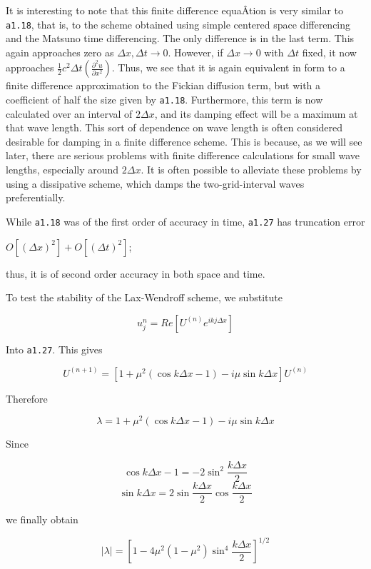 It is interesting to note that this finite difference equaÂ­tion is very
similar to \texttt{a1.18}, that is, to the scheme obtained using simple
centered space differencing and the Matsuno time differencing. The only
difference is in the last term. This again approaches zero as
\(\Delta x,\Delta t \rightarrow 0\). However, if
\(\Delta x \rightarrow 0\) with \(\Delta t\) fixed, it now approaches
\(\frac{1}{2}c^{2}\Delta t\left( \frac{\partial^{2}u}{\partial x^{2}} \right)\).
Thus, we see that it is again equivalent in form to a finite difference
approximation to the Fickian diffusion term, but with a coefficient of
half the size given by \texttt{a1.18}. Furthermore, this term is now
calculated over an interval of \(2\Delta x\), and its damping effect
will be a maximum at that wave length. This sort of dependence on wave
length is often considered desirable for damping in a finite difference
scheme. This is because, as we will see later, there are serious
problems with finite difference calculations for small wave lengths,
especially around \(2\Delta x\). It is often possible to alleviate these
problems by using a dissipative scheme, which damps the
two-grid-interval waves preferentially.

While \texttt{a1.18} was of the first order of accuracy in time,
\texttt{a1.27} has truncation error

\(O\left\lbrack \left( \Delta x \right)^{2} \right\rbrack + O\left\lbrack \left( \Delta t \right)^{2} \right\rbrack\);

thus, it is of second order accuracy in both space and time.

To test the stability of the Lax-Wendroff scheme, we substitute

{\[u_{j}^{n} = Re\left\lbrack U^{\left( n \right)}e^{i  k  j \Delta x} \right\rbrack\]}

Into \texttt{a1.27}. This gives

{\[U^{\left( n + 1 \right)} = \left\lbrack 1 + \mu^{2}\left( \cos{k\Delta x - 1} \right) -
i\mu\sin{k\Delta x} \right\rbrack U^{\left( n \right)}\]}

Therefore

{\[\lambda = 1 + \mu^{2}\left( \cos{k\Delta x - 1} \right) - i\mu\sin{k\Delta x}\]}

Since

\[\cos{k\Delta x - 1} = - 2\sin^{2}\frac{k\Delta x}{2}\]\[\sin{k\Delta x} = 2\sin\frac{k\Delta x}{2}\cos\frac{k\Delta x}{2}\]

we finally obtain

{\[|\lambda| = \left\lbrack  1 - 4\mu^{2}( 1 - \mu^{2} )\sin^{4}\frac{k\Delta x}{2} \right\rbrack^{1/2}\]}

